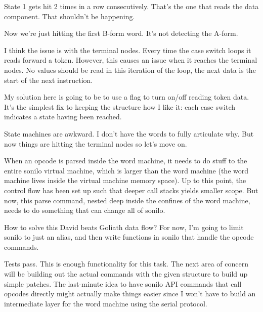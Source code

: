 State 1 gets hit 2 times in a row consecutively. That's the one that reads the data component. That shouldn't be happening.
\par

Now we're just hitting the first B-form word. It's not detecting the A-form.
\par

I think the issue is with the terminal nodes. Every time the case switch loops it reads forward a token. However, this causes an issue when it reaches the terminal nodes. No values should be read in this iteration of the loop, the next data is the start of the next instruction.
\par

My solution here is going to be to use a flag to turn on/off reading token data. It's the simplest fix to keeping the structure how I like it: each case switch indicates a state having been reached.
\par

State machines are awkward. I don't have the words to fully articulate why. But now things are hitting the terminal nodes so let's move on.
\par

When an opcode is parsed inside the word machine, it needs to do stuff to the entire sonilo virtual machine, which is larger than the word machine (the word machine lives inside the virtual machine memory space). Up to this point, the control flow has been set up such that deeper call stacks yields smaller scope. But now, this parse command, nested deep inside the confines of the word machine, needs to do something that can change all of sonilo.
\par

How to solve this David beats Goliath data flow? For now, I'm going to limit sonilo to just an alias, and then write functions in sonilo that handle the opcode commands.
\par

Tests pass. This is enough functionality for this task. The next area of concern will be building out the actual commands with the given structure to build up simple patches. The last-minute idea to have sonilo API commands that call opcodes directly might actually make things easier since I won't have to build an intermediate layer for the word machine using the serial protocol.
\par

